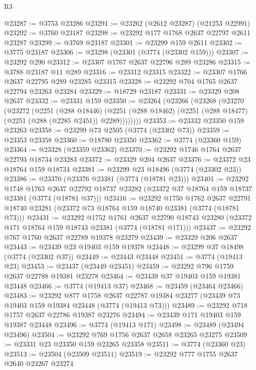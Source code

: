 \begin{lexlean}{R3}
\begin{coremodule}
@23287 := @3753 @23286
@23291 := @23262 (@2612 @23287) (@21253 @22991)
@23292 := @3760 @23187
@23298 := @23292 @177 @1768 @2637 @22797 @2611 @23287
@23299 := @3769 @23187
@23301 := @23299 @159 @2611
@23302 := @3775 @23187
@23306 := @23298 (@23301 (@3774 (@23302 @159)))
@23307 := @23292 @290
@23312 := @23307 @1767 @2637 @22796 @289 @23286
@23315 := @3788 @23187 @11 @289
@23316 := @23312 @23315
@23322 := @23307 @1766 @2637 @22795 @289 @23285 @23315
@23328 := @23292 @704 @1765 @2637 @22794 @23263 @23284
@23329 := @18729 @23187
@23331 := @23329 @208 @2637
@23332 := @23331 @159
@23350 := @23264
    (@23266
      (@23268
        (@23270
          (@23272
            (@2251
              (@288 @18446)
              (@2251 (@288 @18462) (@2251 (@288 @18477) (@2251 (@288 (@2285 @2451)) @2289))))))))
@23353 := @23332 @23350 @159 @23263
@23358 := @23299 @73 @2505 (@3774 (@23302 @73))
@23359 := @23353 @23358
@23360 := @18780 @23350
@23362 := @3774 (@23360 @159)
@23364 := @23328 (@23359 @23362)
@23370 := @23292 @1746 @1764 @2637 @22793 @18734 @23283
@23372 := @23329 @204 @2637
@23376 := @23372 @23 @18764 @159 @18734
@23381 := @23299 @23 @18496 (@3774 (@23302 @23))
@23386 := @23370 (@23376 @23381 (@3774 (@18781 @23)))
@23401 := @23292
    @1748
    @1763
    @2637
    @22792
    @18737
    @23282
    (@23372 @37 @18764 @159 @18737 @23381 (@3774 (@18781 @37)))
@23416 := @23292
    @1750
    @1762
    @2637
    @22791
    @18740
    @23281
    (@23372 @73 @18764 @159 @18740 @23381 (@3774 (@18781 @73)))
@23431 := @23292
    @1752
    @1761
    @2637
    @22790
    @18743
    @23280
    (@23372 @171 @18764 @159 @18743 @23381 (@3774 (@18781 @171)))
@23437 := @23292 @767 @1760 @2637 @22789 @19378 @23279
@23439 := @23329 @206 @2637
@23443 := @23439 @23 @19403 @159 @19378
@23448 := @23299 @37 @18498 (@3774 (@23302 @37))
@23449 := @23443 @23448
@23451 := @3774 (@19413 @23)
@23453 := @23437 (@23449 @23451)
@23459 := @23292 @796 @1759 @2637 @22788 @19381 @23278
@23464 := @23439 @37 @19403 @159 @19381 @23448
@23466 := @3774 (@19413 @37)
@23468 := @23459 (@23464 @23466)
@23483 := @23292
    @877
    @1758
    @2637
    @22787
    @19384
    @23277
    (@23439 @73 @19403 @159 @19384 @23448 (@3774 (@19413 @73)))
@23489 := @23292 @718 @1757 @2637 @22786 @19387 @23276
@23494 := @23439 @171 @19403 @159 @19387 @23448
@23496 := @3774 (@19413 @171)
@23498 := @23489 (@23494 @23496)
@23504 := @23292 @769 @1756 @2637 @2658 @23265 @23275
@23509 := @23331 @23 @23350 @159 @23265 @23358
@23511 := @3774 (@23360 @23)
@23513 := @23504 (@23509 @23511)
@23519 := @23292 @777 @1755 @2637 @2640 @23267 @23274

\end{coremodule}
\end{lexlean}
